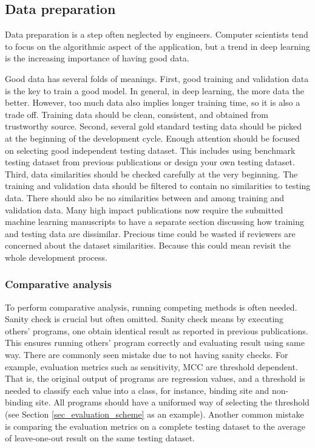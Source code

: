 \subsection{Data preparation}
Data preparation is a step often neglected by engineers. Computer scientists tend to focus on the algorithmic aspect of the application, but a trend in deep learning is the increasing importance of having good data. 

Good data has several folds of meanings. First, good training and validation data is the key to train a good model. In general, in deep learning, the more data the better. However, too much data also implies longer training time, so it is also a trade off. Training data should be clean, consistent, and obtained from trustworthy source. Second, several gold standard testing data should be picked at the beginning of the development cycle. Enough attention should be focused on selecting good independent testing dataset. This includes using benchmark testing dataset from previous publications or design your own testing dataset.  Third, data similarities should be checked carefully at the very beginning. The training and validation data should be filtered to contain no similarities to testing data. There should also be no similarities between and among training and validation data. Many high impact publications now require the submitted machine learning manuscripts to have a separate section discussing how training and testing data are dissimilar. Precious time could be wasted if reviewers are concerned about the dataset similarities. Because this could mean revisit the whole development process.

\subsubsection{Comparative analysis}
To perform comparative analysis, running competing methods is often needed. Sanity check is crucial but often omitted. Sanity check means by executing others' programs, one obtain identical result as reported in previous publications. This ensures running others' program correctly and evaluating result using same way. There are commonly seen mistake due to not having sanity checks. For example, evaluation metrics such as sensitivity, MCC are threshold dependent. That is, the original output of programs are regression values, and a threshold is needed to classify each value into a class, for instance, binding site and non-binding site. All programs should have a uniformed way of selecting the threshold (see Section \ref{sec_evaluation_scheme} as an example). Another common mistake is comparing the evaluation metrics on a complete testing dataset to the average of leave-one-out result on the same testing dataset.

